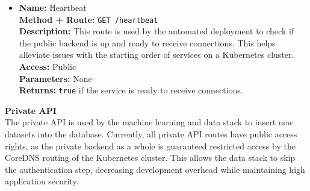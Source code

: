 \begin{itemize}
{\begin{itemize}
      \item {
        \textbf{Name:} Heartbeat\\
        \textbf{Method + Route:} \texttt{GET /heartbeat}\\
        \textbf{Description:} This route is used by the automated deployment to
        check if the public backend is up and ready to receive connections. This
        helps alleviate issues with the starting order of services on a
        Kubernetes cluster.\\
        \textbf{Access:} Public\\
        \textbf{Parameters:} None\\
        \textbf{Returns:} \texttt{true} if the service is ready to receive
        connections.\\
    }
    \end{itemize}
  }

\end{itemize}

\textbf{Private API}\\
The private API is used by the machine learning and data stack to insert new
datasets into the database. Currently, all private API routes have public access
rights, as the private backend as a whole is guaranteed restricted access by the
CoreDNS routing of the Kubernetes cluster. This allows the data stack to skip
the authentication step, decreasing development overhead while maintaining high
application security.


